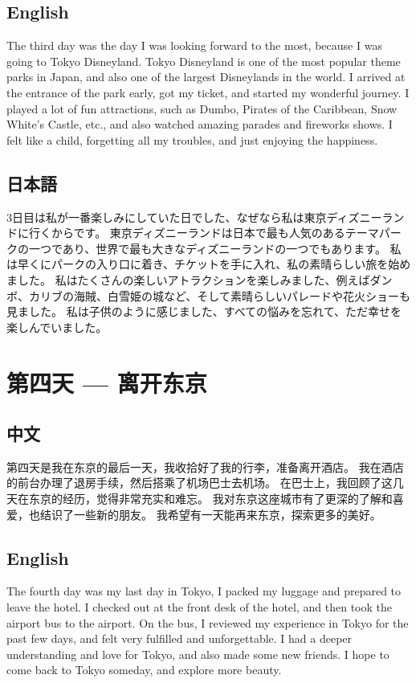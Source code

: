 \documentclass{kspaper}
\begin{document}
\subsection{English}

The third day was the day I was looking forward to the most, because I was going to Tokyo Disneyland.
Tokyo Disneyland is one of the most popular theme parks in Japan, and also one of the largest Disneylands in the world.
I arrived at the entrance of the park early, got my ticket, and started my wonderful journey.
I played a lot of fun attractions, such as Dumbo, Pirates of the Caribbean, Snow White's Castle, etc.,
and also watched amazing parades and fireworks shows.
I felt like a child, forgetting all my troubles, and just enjoying the happiness.

\subsection{日本語}

3日目は私が一番楽しみにしていた日でした、なぜなら私は東京ディズニーランドに行くからです。
東京ディズニーランドは日本で最も人気のあるテーマパークの一つであり、世界で最も大きなディズニーランドの一つでもあります。
私は早くにパークの入り口に着き、チケットを手に入れ、私の素晴らしい旅を始めました。
私はたくさんの楽しいアトラクションを楽しみました、例えばダンボ、カリブの海賊、白雪姫の城など、そして素晴らしいパレードや花火ショーも見ました。
私は子供のように感じました、すべての悩みを忘れて、ただ幸せを楽しんでいました。

\section{第四天 --- 离开东京}

\subsection{中文}

第四天是我在东京的最后一天，我收拾好了我的行李，准备离开酒店。
我在酒店的前台办理了退房手续，然后搭乘了机场巴士去机场。
在巴士上，我回顾了这几天在东京的经历，觉得非常充实和难忘。
我对东京这座城市有了更深的了解和喜爱，也结识了一些新的朋友。
我希望有一天能再来东京，探索更多的美好。

\subsection{English}

The fourth day was my last day in Tokyo, I packed my luggage and prepared to leave the hotel.
I checked out at the front desk of the hotel, and then took the airport bus to the airport.
On the bus, I reviewed my experience in Tokyo for the past few days, and felt very fulfilled and unforgettable.
I had a deeper understanding and love for Tokyo, and also made some new friends.
I hope to come back to Tokyo someday, and explore more beauty.
\end{document}
